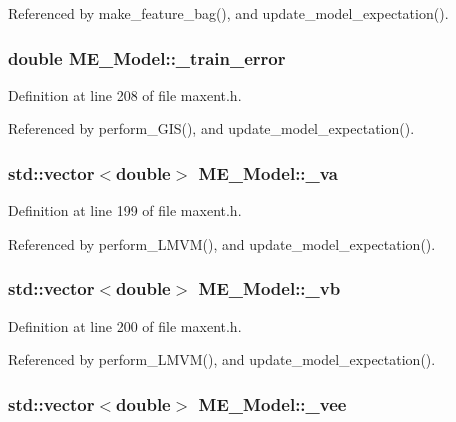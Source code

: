 Referenced by make\_\-feature\_\-bag(), and update\_\-model\_\-expectation().\hypertarget{classME__Model_aab235eaccf24824812370d60ca079e4}{
\subsubsection[{\_\-train\_\-error}]{\setlength{\rightskip}{0pt plus 5cm}double {\bf ME\_\-Model::\_\-train\_\-error}}}
\label{classME__Model_aab235eaccf24824812370d60ca079e4}




Definition at line 208 of file maxent.h.

Referenced by perform\_\-GIS(), and update\_\-model\_\-expectation().\hypertarget{classME__Model_30e8d601c952bf0aa22da5837149e7a1}{
\subsubsection[{\_\-va}]{\setlength{\rightskip}{0pt plus 5cm}std::vector$<$double$>$ {\bf ME\_\-Model::\_\-va}}}
\label{classME__Model_30e8d601c952bf0aa22da5837149e7a1}




Definition at line 199 of file maxent.h.

Referenced by perform\_\-LMVM(), and update\_\-model\_\-expectation().\hypertarget{classME__Model_85968df26e2c2515e94e9d7dc5904d80}{
\subsubsection[{\_\-vb}]{\setlength{\rightskip}{0pt plus 5cm}std::vector$<$double$>$ {\bf ME\_\-Model::\_\-vb}}}
\label{classME__Model_85968df26e2c2515e94e9d7dc5904d80}




Definition at line 200 of file maxent.h.

Referenced by perform\_\-LMVM(), and update\_\-model\_\-expectation().\hypertarget{classME__Model_6d1c21872d8899cd512ce560216bcfda}{
\subsubsection[{\_\-vee}]{\setlength{\rightskip}{0pt plus 5cm}std::vector$<$double$>$ {\bf ME\_\-Model::\_\-vee}}}
\label{classME__Model_6d1c21872d8899cd512ce560216bcfda}





